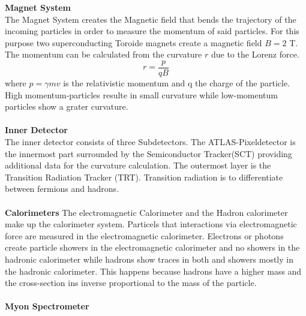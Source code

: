 \documentclass[../Bachelorarbeit.tex]{subfiles}
\begin{document}
\textbf{Magnet System}\\
The Magnet System creates the Magnetic field that bends the trajectory of the incoming particles in order to measure the momentum of said particles.
For this purpose two superconducting Toroide magnets create a magnetic field $B=2$ T. The momentum can be calculated from the curvature $r$ due to the Lorenz force.
\begin{equation}
    r=\frac{p}{q B}
\end{equation}
where $p=\gamma m v$ is the relativistic momentum and q the charge of the particle. High momentum-particles resulte in small curvature while low-momentum particles show a grater curvature.
\\\\
\textbf{Inner Detector}\\
The inner detector consists of three Subdetectors. The ATLAS-Pixeldetector is the innermost part surrounded by the Semiconductor Tracker(SCT) providing additional data for the curvature calculation.
The outermost layer is the Transition Radiation Tracker (TRT). Transition radiation is to differentiate between fermions and hadrons.
\\\\
\textbf{Calorimeters}
The electromagnetic Calorimeter and the Hadron calorimeter make up the calorimeter system. Particels that interactions via electromagnetic force are measured in
the electromagnetic calorimeter. Electrons or photons create particle showers in the electromagnetic calorimeter and no showers in the hadronic calorimeter while hadrons show traces in both and showers mostly in the hadronic calorimeter.
This happens because hadrons have a higher mass and the cross-section ins inverse proportional to the mass of the particle.
\\\\

\textbf{Myon Spectrometer}
\end{document}
